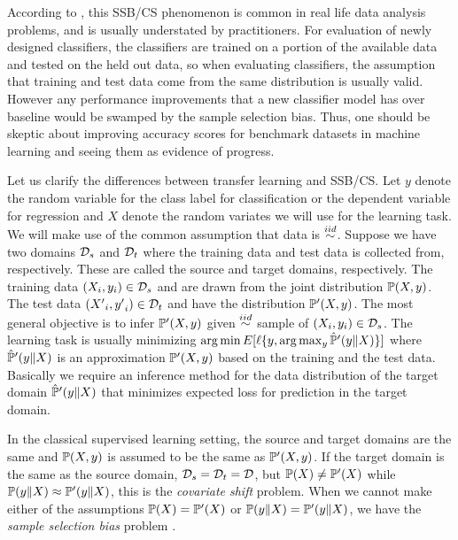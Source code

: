 \documentclass[12pt,oneside,final]{thesis}\usepackage[]{graphicx}\usepackage[]{color}
\begin{document}
According to \cite{Hand2006}, this SSB/CS phenomenon is common in real life data analysis problems, and is usually understated by practitioners. For evaluation of newly designed classifiers, the classifiers are trained on a portion of the available data and tested on the held out data, so when evaluating classifiers, the assumption that training and test data come from the same distribution is usually valid. However any performance improvements that a new classifier model has over baseline would be swamped  by the sample selection bias. Thus, one should be skeptic about improving accuracy scores for benchmark datasets in machine learning and seeing them as evidence of progress.

Let us clarify the differences between transfer learning  and SSB/CS.  Let $y$ denote the random variable for the class label  for classification or the dependent variable for regression and $X$ denote the random variates we will use for the learning task. We will  make use of  the common assumption that data is $\stackrel{iid}{\sim}$.  
Suppose we have two domains  ${\mathcal{D}}_s$ and ${\mathcal{D}}_t$ where the training data and test data is collected from, respectively. These are called the source and target domains, respectively.
The training data $\left(X_i,y_i\right) \in {\mathcal{D}}_s$ and are drawn from the joint distribution $\mathbb{P}(X,y)$. 
The test data $\left({X'}_i,{y'}_i\right) \in {\mathcal{D}}_t$ and have the distribution $\mathbb{P}'(X,y)$.
The most general objective is to infer $\mathbb{P}'(X,y)$  given $\stackrel{iid}{\sim}$ sample of $\left(X_i,y_i\right) \in {\mathcal{D}}_s$. 
The learning task is usually minimizing  $\arg\min E[\ell\{y, \arg\max_y{\hat{\mathbb{P}}'(y \| X) } \}]$  
where $\hat{\mathbb{P}}'(y \| X)$  is an approximation  $\mathbb{P}'(X,y)$ based on the training and the test data. Basically we require an inference method for the data distribution of the target domain   $\hat{\mathbb{P}}'(y \| X)$ that minimizes expected loss for prediction in the target domain.

In the classical supervised learning setting, the source and target domains are the same and  $\mathbb{P}(X,y)$ is assumed to be the same as $\mathbb{P}'(X,y)$. If the target domain is the same as the source domain, ${\mathcal{D}}_s={\mathcal{D}}_t=\mathcal{D}$, but $\mathbb{P}(X) \neq\mathbb{P}'(X)$ while $\mathbb{P}(y\|X) \approx \mathbb{P}'(y \| X)$, this is the \emph{covariate shift} problem.  When we cannot make either of the assumptions $\mathbb{P}(X) = \mathbb{P}'(X)$ or $\mathbb{P}(y\|X) = \mathbb{P}'(y \| X)$, we have the \emph{sample selection bias} problem \cite{Zadrozny2004a}.
\end{document}

